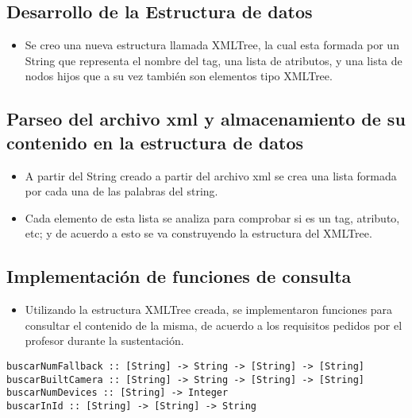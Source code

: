 \documentclass[11pt]{article} %
\begin{document}


\subsection{Desarrollo de la Estructura de datos}
\begin{itemize}
	\item Se creo una nueva estructura llamada XMLTree, la cual esta formada por un String que representa el nombre del tag, una lista de atributos, y una lista de nodos hijos que a su vez también son elementos tipo XMLTree.
\end{itemize}



\subsection{Parseo del archivo xml y almacenamiento de su contenido en la estructura de datos}
\begin{itemize}
	\item A partir del String creado a partir del archivo xml se crea una lista formada por cada una de las palabras del string.
        \item Cada elemento de esta lista se analiza para comprobar si es un tag, atributo, etc; y de acuerdo a esto se va construyendo la estructura del XMLTree.
\end{itemize}
{\scriptsize

}
\subsection{Implementación de funciones de consulta}
\begin{itemize}
	\item Utilizando la estructura XMLTree creada, se implementaron funciones para consultar el contenido de la misma, de acuerdo a los requisitos pedidos por el profesor durante la sustentación.
\end{itemize}

\begin{lstlisting}[frame=single]
buscarNumFallback :: [String] -> String -> [String] -> [String]
buscarBuiltCamera :: [String] -> String -> [String] -> [String]
buscarNumDevices :: [String] -> Integer
buscarInId :: [String] -> [String] -> String
\end{lstlisting}
\end{document}
